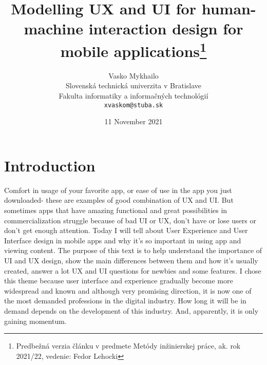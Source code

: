 \documentclass[10pt,twoside,english,a4paper]{article}
\title{Modelling UX and UI for human-machine interaction design for mobile applications\thanks{Predbežná verzia článku v predmete Metódy inžinierskej práce, ak. rok 2021/22, vedenie: Fedor Lehocki}} %
\author{Vasko Mykhailo\\[2pt]
	{\small Slovenská technická univerzita v Bratislave}\\
	{\small Fakulta informatiky a informačných technológií}\\
	{\small \texttt{xvaskom@stuba.sk}}
	}
\date{\small 11 November 2021} %
\begin{document}
\maketitle

%
%
%
%
%
%
%



\section{Introduction}

Comfort in usage of your favorite app, or ease of use in the app you just downloaded- these are examples of good combination of UX and UI. But sometimes apps that have amazing functional and great possibilities in commercialization struggle because of bad UI or UX, don’t have or lose users or don't get enough attention.%
 Today I will tell about User Experience and User Interface design in mobile apps and why it’s so important in using app and viewing content\cite{Examples}. 
 The purpose of this text is to help understand the importance of UI and UX design, show the main differences between them and how it’s usually created, answer a lot UX and UI questions for newbies and some features. I chose this theme because user interface and experience gradually become more widespread and known and although very promising direction, it is now one of the most demanded professions in the digital industry. How long it will be in demand depends on the development of this industry. And, apparently, it is only gaining momentum.
\end{document}
